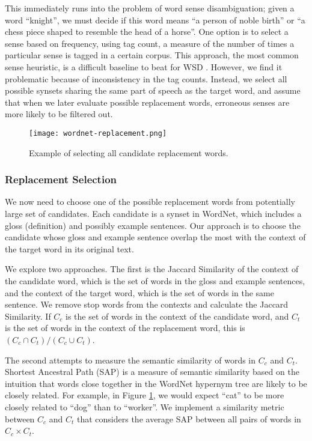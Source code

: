 \documentclass[12pt]{article}
\begin{document}
This immediately runs into the problem of word sense disambiguation; given a word ``knight'', we must decide if this word means ``a person of noble birth'' or ``a chess piece shaped to resemble the head of a horse''. One option is to select a sense based on frequency, using tag count, a measure of the number of times a particular sense is tagged in a certain corpus. This approach, the most common sense heuristic, is a difficult baseline to beat for WSD \cite{mccarthy}. However, we find it problematic because of inconsistency in the tag counts. Instead, we select all possible synsets sharing the same part of speech as the target word, and assume that when we later evaluate possible replacement words, erroneous senses are more likely to be filtered out.

\begin{figure}[h]
	\centering
	\texttt{[image: wordnet-replacement.png]}
	\caption{Example of selecting all candidate replacement words.}
	\label{fig:wnmapexample}
\end{figure}

\subsubsection{Replacement Selection}

We now need to choose one of the possible replacement words from potentially large set of candidates. Each candidate is a synset in WordNet, which includes a gloss (definition) and possibly example sentences. Our approach is to choose the candidate whose gloss and example sentence overlap the most with the context of the target word in its original text.

We explore two approaches. The first is the Jaccard Similarity of the context of the candidate word, which is the set of words in the gloss and example sentences, and the context of the target word, which is the set of words in the same sentence. We remove stop words from the contexts and calculate the Jaccard Similarity. If $C_c$ is the set of words in the context of the candidate word, and $C_t$ is the set of words in the context of the replacement word, this is $(C_c \cap C_t) / (C_c \cup C_t)$.

The second attempts to measure the semantic similarity of words in $C_c$ and $C_t$. Shortest Ancestral Path (SAP) is a measure of semantic similarity based on the intuition that words close together in the WordNet hypernym tree are likely to be closely related. For example, in Figure \ref{fig:wnmapexample}, we would expect ``cat'' to be more closely related to ``dog'' than to ``worker''. We implement a similarity metric between $C_c$ and $C_t$ that considers the average SAP between all pairs of words in $C_c \times C_t$.
\end{document}
